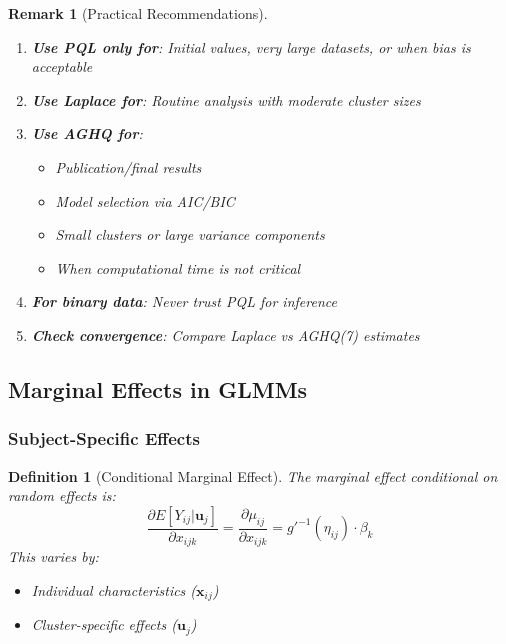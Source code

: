 \documentclass{article}
\newtheorem{definition}{Definition}
\newtheorem{remark}{Remark}
\begin{document}
\begin{remark}[Practical Recommendations]
\begin{enumerate}
    \item \textbf{Use PQL only for}: Initial values, very large datasets, or when bias is acceptable
    \item \textbf{Use Laplace for}: Routine analysis with moderate cluster sizes
    \item \textbf{Use AGHQ for}: 
    \begin{itemize}
        \item Publication/final results
        \item Model selection via AIC/BIC
        \item Small clusters or large variance components
        \item When computational time is not critical
    \end{itemize}
    \item \textbf{For binary data}: Never trust PQL for inference
    \item \textbf{Check convergence}: Compare Laplace vs AGHQ(7) estimates
\end{enumerate}
\end{remark}

\subsection{Marginal Effects in GLMMs}

\subsubsection{Subject-Specific Effects}

\begin{definition}[Conditional Marginal Effect]
The marginal effect conditional on random effects is:
\begin{equation}
\frac{\partial E[Y_{ij}|\mathbf{u}_j]}{\partial x_{ijk}} = \frac{\partial \mu_{ij}}{\partial x_{ijk}} = g'^{-1}(\eta_{ij}) \cdot \beta_k
\end{equation}
This varies by:
\begin{itemize}
    \item Individual characteristics ($\mathbf{x}_{ij}$)
    \item Cluster-specific effects ($\mathbf{u}_j$)
\end{itemize}
\end{definition}
\end{document}
